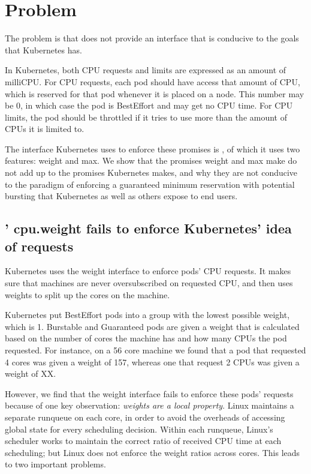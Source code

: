 \section{Problem}\label{s:problem}


The problem is that \cgroups{} does not provide an interface that is conducive
to the goals that Kubernetes has. 

In Kubernetes, both CPU requests and limits are expressed as an amount of
milliCPU. For CPU requests, each pod should have access that amount of CPU,
which is reserved for that pod whenever it is placed on a node. This number may
be 0, in which case the pod is BestEffort and may get no CPU time. For CPU
limits, the pod should be throttled if it tries to use more than the amount of
CPUs it is limited to.

The interface Kubernetes uses to enforce these promises is \cgroups{}, of which
it uses two features: weight and max. We show that the promises weight and max
make do not add up to the promises Kubernetes makes, and why they are not
conducive to the paradigm of enforcing a guaranteed minimum reservation with
potential bursting that Kubernetes as well as others expose to end users.


\subsection{\cgroups{}' cpu.weight fails to enforce Kubernetes' idea of requests}

Kubernetes uses the \cgroups{} weight interface to enforce pods' CPU requests.
It makes sure that machines are never oversubscribed on requested CPU, and then
uses weights to split up the cores on the machine.

Kubernetes put BestEffort pods into a group with the lowest possible weight,
which is 1. Burstable and Guaranteed pods are given a weight that is calculated
based on the number of cores the machine has and how many CPUs the pod
requested. For instance, on a 56 core machine we found that a pod that requested
4 cores was given a weight of 157, whereas one that request 2 CPUs was given a
weight of XX.

However, we find that the weight interface fails to enforce these pods' requests
because of one key observation: \textit{weights are a local property}. Linux
maintains a separate runqueue on each core, in order to avoid the overheads of
accessing global state for every scheduling decision. Within each runqueue,
Linux's scheduler works to maintain the correct ratio of received CPU time at
each scheduling; but Linux does not enforce the weight ratios across cores. This
leads to two important problems. 


